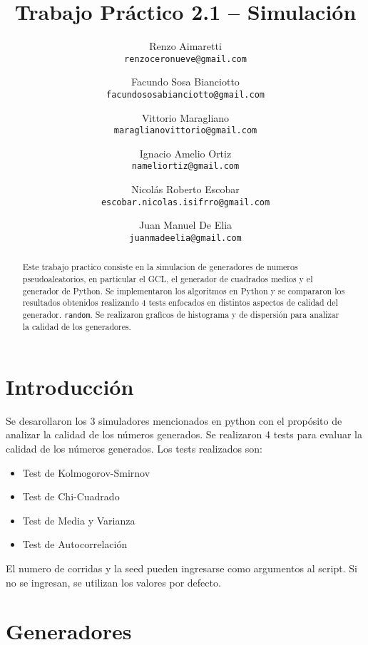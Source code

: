 \documentclass{article}
\title{Trabajo Práctico 2.1 -- Simulación}
\author{
    Renzo Aimaretti \\ \texttt{renzoceronueve@gmail.com}
    \and
    Facundo Sosa Bianciotto \\ \texttt{facundososabianciotto@gmail.com}
    \and
    Vittorio Maragliano \\ \texttt{maraglianovittorio@gmail.com}
    \and
    Ignacio Amelio Ortiz \\ \texttt{nameliortiz@gmail.com}
    \and
    Nicolás Roberto Escobar \\ \texttt{escobar.nicolas.isifrro@gmail.com}
    \and
    Juan Manuel De Elia \\ \texttt{juanmadeelia@gmail.com}
}
\begin{document}
\maketitle
\begin{abstract}
    Este trabajo practico consiste en la simulacion de generadores de numeros pseudoaleatorios, en particular el GCL, el generador de cuadrados medios y el generador de Python. Se implementaron los algoritmos en Python y se compararon los resultados obtenidos realizando 4 tests enfocados en distintos aspectos de calidad del generador. \texttt{random}. Se realizaron graficos de histograma y de dispersión para analizar la calidad de los generadores. 
\end{abstract}

\section{Introducción}
Se desarollaron los 3 simuladores mencionados en python con el propósito de analizar la calidad de los números generados. Se realizaron 4 tests para evaluar la calidad de los números generados. Los tests realizados son:
\begin{itemize}
    \item Test de Kolmogorov-Smirnov
    \item Test de Chi-Cuadrado
    \item Test de Media y Varianza
    \item Test de Autocorrelación
\end{itemize}
El numero de corridas y la seed pueden ingresarse como argumentos al script. Si no se ingresan, se utilizan los valores por defecto.

\section{Generadores}
\end{document}
